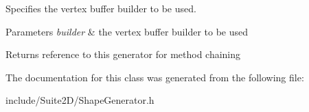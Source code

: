Specifies the vertex buffer builder to be used.


\begin{DoxyParams}{Parameters}
{\em builder} & the vertex buffer builder to be used \\
\hline
\end{DoxyParams}
\begin{DoxyReturn}{Returns}
reference to this generator for method chaining 
\end{DoxyReturn}


The documentation for this class was generated from the following file\+:\begin{DoxyCompactItemize}
\item 
include/\+Suite2\+D/Shape\+Generator.\+h\end{DoxyCompactItemize}
